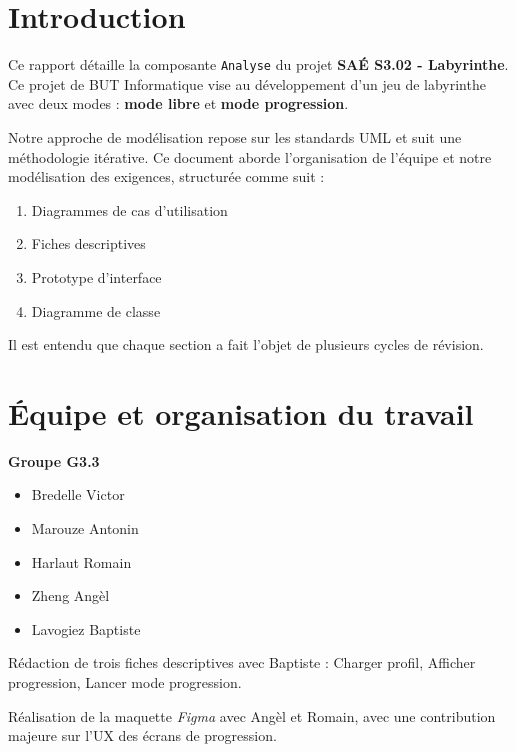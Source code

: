 \documentclass{butexFR}
\begin{document}
\fairepagedegarde
\fairemarges
\tabledematieres



\section{Introduction}

Ce rapport détaille la composante \texttt{Analyse} du projet \textbf{SAÉ S3.02 - Labyrinthe}. Ce projet de BUT Informatique vise au développement d'un jeu de labyrinthe avec deux modes : \textbf{mode libre} et \textbf{mode progression}.

Notre approche de modélisation repose sur les standards UML et suit une méthodologie itérative. Ce document aborde l'organisation de l'équipe et notre modélisation des exigences, structurée comme suit :

\begin{enumerate}
    \item Diagrammes de cas d'utilisation
    \item Fiches descriptives
    \item Prototype d'interface
    \item Diagramme de classe
\end{enumerate}

Il est entendu que chaque section a fait l'objet de plusieurs cycles de révision.

\section{Équipe et organisation du travail}
\textbf{Groupe G3.3}

\begin{itemize}
    \item Bredelle Victor
    \item Marouze Antonin
    \item Harlaut Romain
    \item Zheng Angèl
    \item Lavogiez Baptiste
\end{itemize}


Rédaction de trois fiches descriptives avec Baptiste : Charger profil, Afficher progression, Lancer mode progression.


Réalisation de la maquette \textit{Figma} avec Angèl et Romain, avec une contribution majeure sur l'UX des écrans de progression.
\end{document}
